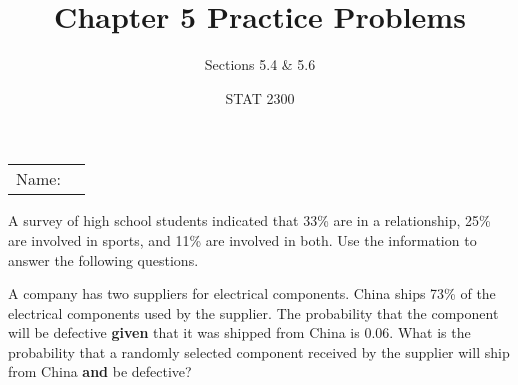 \documentclass[noanswers]{exam}
\title{Chapter 5 Practice Problems}
\author{Sections 5.4 \& 5.6}
\date{STAT 2300}
\begin{document}
\noindent\begin{tabular}{@{}p{.3in}p{3in}@{}}
Name: & \hrulefill
\end{tabular}

\vspace{3mm}

\begin{questions} 
		
	\question A survey of high school students indicated that 33\% are in a relationship, 25\% are involved in sports, and 11\% are involved in both. Use the information to answer the following questions.

\vspace{3mm}


\question A company has two suppliers for electrical components. China ships 73\% of the electrical components used by the supplier. The probability that the component will be defective \textbf{given} that it was shipped from China is 0.06. What is the probability that a randomly selected component received by the supplier will ship from China \textbf{and} be defective?


\end{questions}
\end{document}
